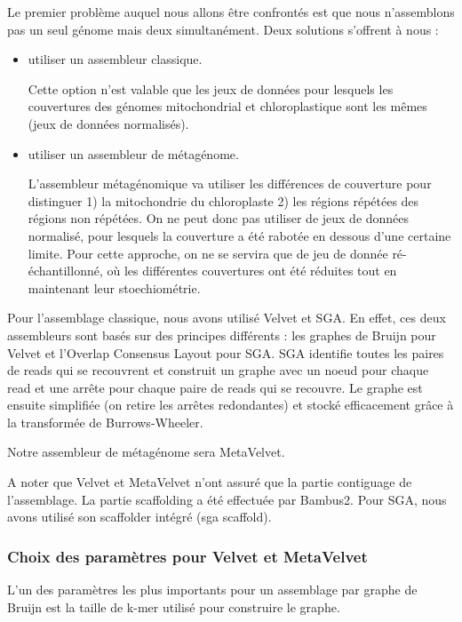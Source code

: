 \documentclass[a4paper]{article}
\begin{document}
Le premier problème auquel nous allons être confrontés est que nous n'assemblons pas un seul génome mais deux simultanément. Deux solutions s'offrent à nous : 
\begin{itemize}
\item utiliser un assembleur classique.

Cette option n'est valable que les jeux de données pour lesquels les couvertures des génomes mitochondrial et chloroplastique sont les mêmes (jeux de données normalisés). 

\item utiliser un assembleur de métagénome.

L'assembleur métagénomique va utiliser les différences de couverture pour distinguer 1) la mitochondrie du chloroplaste 2) les régions répétées des régions non répétées. On ne peut donc pas utiliser de jeux de données normalisé, pour lesquels la couverture a été rabotée en dessous d'une certaine limite. Pour cette approche, on ne se servira que de jeu de donnée ré-échantillonné, où les différentes couvertures ont été réduites tout en maintenant leur stoechiométrie.  

\end{itemize}

Pour l'assemblage classique, nous avons utilisé Velvet et SGA. En effet, ces deux assembleurs sont basés sur des principes différents : les graphes de Bruijn pour Velvet et l'Overlap Consensus Layout pour SGA. SGA identifie toutes les paires de reads qui se recouvrent et construit un graphe avec un noeud pour chaque read et une arrête pour chaque paire de reads qui se recouvre. Le graphe est ensuite simplifiée (on retire les arrêtes redondantes) et stocké efficacement grâce à la transformée de Burrows-Wheeler. \cite{simpson2012efficient}

Notre assembleur de métagénome sera MetaVelvet. 

A noter que Velvet et MetaVelvet n'ont assuré que la partie contiguage de l'assemblage. La partie scaffolding a été effectuée par Bambus2. Pour SGA, nous avons utilisé son scaffolder intégré (sga scaffold). 

\subsubsection{Choix des paramètres pour Velvet et MetaVelvet}

L'un des paramètres les plus importants pour un assemblage par graphe de Bruijn est la taille de k-mer utilisé pour construire le graphe. 
\end{document}
